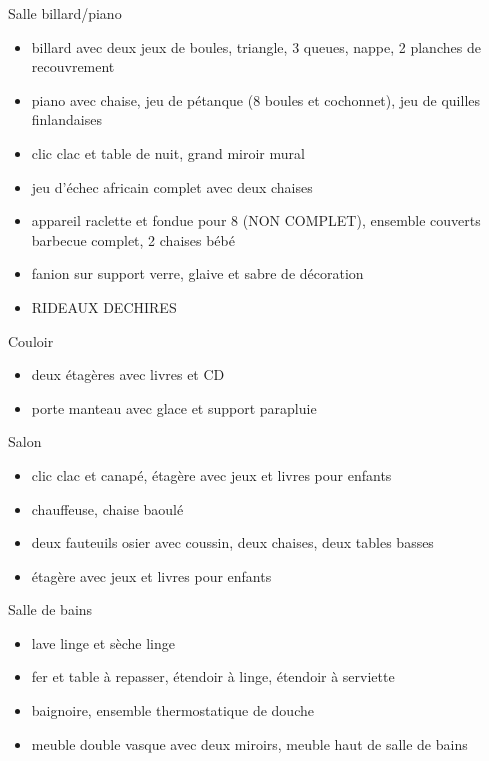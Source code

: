 \documentclass[a4paper,11pt]{article}
\begin{document}
\vspace{0.25cm}

Salle billard/piano
\begin{itemize}
\item billard avec deux jeux de boules, triangle, 3 queues, nappe, 2 planches de recouvrement
\item piano avec chaise, jeu de pétanque (8 boules et cochonnet), jeu de quilles finlandaises
\item clic clac et table de nuit, grand miroir mural
\item jeu d'échec africain complet avec deux chaises
\item appareil raclette et fondue pour 8 (NON COMPLET), ensemble couverts barbecue complet, 2 chaises bébé
\item fanion sur support verre, glaive et sabre de décoration
\item RIDEAUX DECHIRES
\end{itemize}

\vspace{0.25cm}

Couloir
\begin{itemize}
\item deux étagères avec livres et CD
\item porte manteau avec glace et support parapluie
\end{itemize}

\vspace{0.25cm}

Salon
\begin{itemize}
\item clic clac et canapé, étagère avec jeux et livres pour enfants
\item chauffeuse, chaise baoulé
\item deux fauteuils osier avec coussin, deux chaises, deux tables basses
\item étagère avec jeux et livres pour enfants
\end{itemize}


\vspace{0.25cm}

Salle de bains
\begin{itemize}
\item lave linge et sèche linge
\item fer et table à repasser, étendoir à linge, étendoir à serviette
\item baignoire, ensemble thermostatique de douche
\item meuble double vasque avec deux miroirs, meuble haut de salle de bains
\end{itemize}
\end{document}

